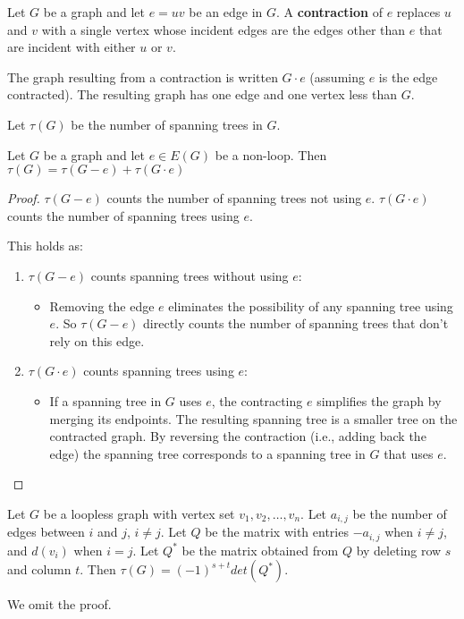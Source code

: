 \begin{definition}[Contraction]
	Let $G$ be a graph and let $e = uv$ be an edge in $G$. A \textbf{contraction} of $e$ replaces $u$ and $v$ with a single vertex whose incident edges are the edges other than $e$ that are incident with either $u$ or $v$.
\end{definition}

The graph resulting from a contraction is written $G \cdot e$ (assuming $e$ is the edge contracted). The resulting graph has one edge and one vertex less than $G$.

Let $\tau(G)$ be the number of spanning trees in $G$.

\begin{proposition}
	Let $G$ be a graph and let $e \in E(G)$ be a non-loop. Then \(\tau(G) = \tau(G -e) + \tau(G \cdot e)\)
\end{proposition}

\begin{proof}
	\(\tau(G-e)\) counts the number of spanning trees not using $e$. \(\tau(G \cdot e)\) counts the number of spanning trees using $e$.

	This holds as:
	\begin{enumerate}
		\item $\tau(G-e)$ counts spanning trees without using $e$:
		      \begin{itemize}
			      \item Removing the edge $e$ eliminates the possibility of any spanning tree using $e$. So \(\tau(G-e)\) directly counts the number of spanning trees that don't rely on this edge.
		      \end{itemize}
		\item \(\tau(G \cdot e)\) counts spanning trees using $e$:
		      \begin{itemize}
			      \item If a spanning tree in $G$ uses $e$, the contracting $e$ simplifies the graph by merging its endpoints. The resulting spanning tree is a smaller tree on the contracted graph. By reversing the contraction (i.e., adding back the edge) the spanning tree corresponds to a spanning tree in $G$ that uses $e$.
		      \end{itemize}
	\end{enumerate}
\end{proof}

\begin{theorem}
	Let $G$ be a loopless graph with vertex set $v_{1}, v_{2}, \ldots, v_{n}$. Let $a_{i,j}$ be the number of edges between $i$ and $j$, $i \ne j$. Let $Q$ be the matrix with entries $-a_{i,j}$ when $i \ne j$, and $d(v_{i})$ when $i = j$. Let $Q^{*}$ be the matrix obtained from $Q$ by deleting row $s$ and column $t$. Then \(\tau(G) = (-1)^{s+t} det(Q^{*})\).
\end{theorem}
We omit the proof.

